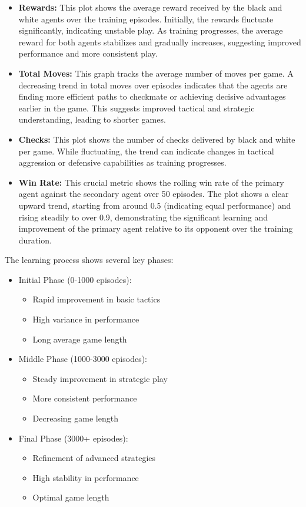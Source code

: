 \documentclass[conference]{IEEEtran}
\begin{document}
\begin{itemize}
\item \textbf{Rewards:} This plot shows the average reward received by the black and white agents over the training episodes. Initially, the rewards fluctuate significantly, indicating unstable play. As training progresses, the average reward for both agents stabilizes and gradually increases, suggesting improved performance and more consistent play.
\item \textbf{Total Moves:} This graph tracks the average number of moves per game. A decreasing trend in total moves over episodes indicates that the agents are finding more efficient paths to checkmate or achieving decisive advantages earlier in the game. This suggests improved tactical and strategic understanding, leading to shorter games.
\item \textbf{Checks:} This plot shows the number of checks delivered by black and white per game. While fluctuating, the trend can indicate changes in tactical aggression or defensive capabilities as training progresses.
\item \textbf{Win Rate:} This crucial metric shows the rolling win rate of the primary agent against the secondary agent over 50 episodes. The plot shows a clear upward trend, starting from around 0.5 (indicating equal performance) and rising steadily to over 0.9, demonstrating the significant learning and improvement of the primary agent relative to its opponent over the training duration.
\end{itemize}

The learning process shows several key phases:

\begin{itemize}
\item Initial Phase (0-1000 episodes):
   \begin{itemize}
   \item Rapid improvement in basic tactics
   \item High variance in performance
   \item Long average game length
   \end{itemize}

\item Middle Phase (1000-3000 episodes):
   \begin{itemize}
   \item Steady improvement in strategic play
   \item More consistent performance
   \item Decreasing game length
   \end{itemize}

\item Final Phase (3000+ episodes):
   \begin{itemize}
   \item Refinement of advanced strategies
   \item High stability in performance
   \item Optimal game length
   \end{itemize}
\end{itemize}
\end{document}
